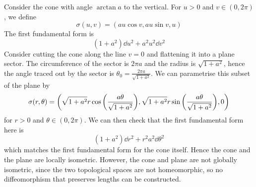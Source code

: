 \documentclass[a4paper]{article}
\begin{document}
\begin{example}
	Consider the cone with angle \( \arctan a \) to the vertical.
	For \( u > 0 \) and \( v \in (0,2\pi) \), we define
	\[
		\sigma(u,v) = (au\cos v, au\sin v, u)
	\]
	The first fundamental form is
	\[
		(1+a^2)\dd{u}^2 + a^2 u^2 \dd{v}^2
	\]
	Consider cutting the cone along the line \( v = 0 \) and flattening it into a plane sector.
	The circumference of the sector is \( 2 \pi a \) and the radius is \( \sqrt{1+a^2} \), hence the angle traced out by the sector is \( \theta_0 = \frac{2 \pi a}{\sqrt{1+a^2}} \).
	We can parametrise this subset of the plane by
	\[
		\sigma(r,\theta) = \qty(\sqrt{1+a^2} r\cos\qty(\frac{a\theta}{\sqrt{1+a^2}}), \sqrt{1+a^2} r\sin\qty(\frac{a\theta}{\sqrt{1+a^2}}), 0)
	\]
	for \( r > 0 \) and \( \theta \in (0,2\pi) \).
	We can then check that the first fundamental form here is
	\[
		(1+a^2) \dd{r}^2 + r^2 a^2 \dd{\theta}^2
	\]
	which matches the first fundamental form for the cone itself.
	Hence the cone and the plane are locally isometric.
	However, the cone and plane are not globally isometric, since the two topological spaces are not homeomorphic, so no diffeomorphism that preserves lengths can be constructed.
\end{example}
\end{document}
